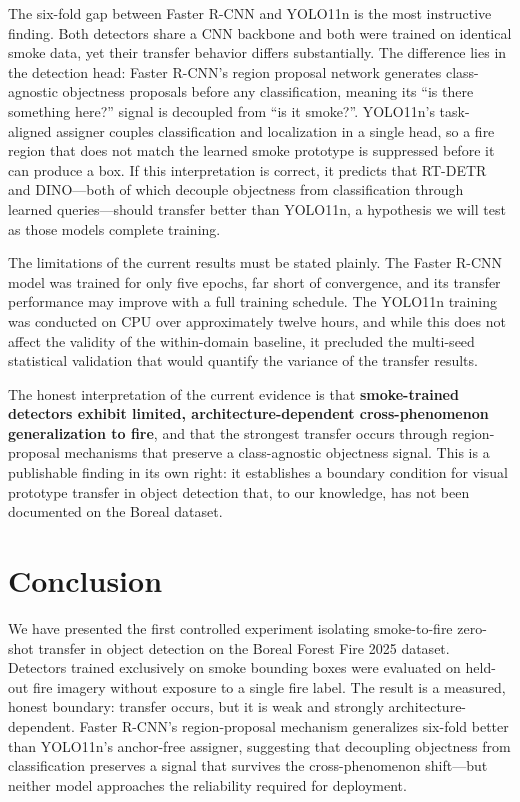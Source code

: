 \documentclass[10pt,twocolumn]{article}
\begin{document}
The six-fold gap between Faster R-CNN and YOLO11n is the most instructive finding. Both detectors share a CNN backbone and both were trained on identical smoke data, yet their transfer behavior differs substantially. The difference lies in the detection head: Faster R-CNN's region proposal network generates class-agnostic objectness proposals before any classification, meaning its ``is there something here?'' signal is decoupled from ``is it smoke?''. YOLO11n's task-aligned assigner couples classification and localization in a single head, so a fire region that does not match the learned smoke prototype is suppressed before it can produce a box. If this interpretation is correct, it predicts that RT-DETR and DINO---both of which decouple objectness from classification through learned queries---should transfer better than YOLO11n, a hypothesis we will test as those models complete training.

The limitations of the current results must be stated plainly. The Faster R-CNN model was trained for only five epochs, far short of convergence, and its transfer performance may improve with a full training schedule. The YOLO11n training was conducted on CPU over approximately twelve hours, and while this does not affect the validity of the within-domain baseline, it precluded the multi-seed statistical validation that would quantify the variance of the transfer results.

The honest interpretation of the current evidence is that \textbf{smoke-trained detectors exhibit limited, architecture-dependent cross-phenomenon generalization to fire}, and that the strongest transfer occurs through region-proposal mechanisms that preserve a class-agnostic objectness signal. This is a publishable finding in its own right: it establishes a boundary condition for visual prototype transfer in object detection that, to our knowledge, has not been documented on the Boreal dataset.

\section{Conclusion}

We have presented the first controlled experiment isolating smoke-to-fire zero-shot transfer in object detection on the Boreal Forest Fire 2025 dataset. Detectors trained exclusively on smoke bounding boxes were evaluated on held-out fire imagery without exposure to a single fire label. The result is a measured, honest boundary: transfer occurs, but it is weak and strongly architecture-dependent. Faster R-CNN's region-proposal mechanism generalizes six-fold better than YOLO11n's anchor-free assigner, suggesting that decoupling objectness from classification preserves a signal that survives the cross-phenomenon shift---but neither model approaches the reliability required for deployment.
\end{document}
